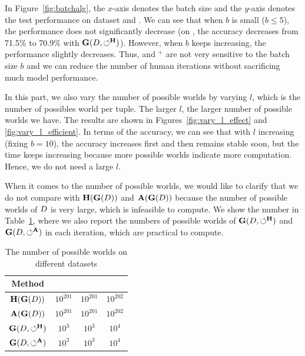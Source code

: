 
In Figure~\ref{fig:batchalg}, the $x$-axis denotes the batch size and the $y$-axis denotes the test performance on dataset \adult and  \imdbl. We can see that when $b$ is small (\ie $b \le 5$), the performance does not significantly decrease (\eg on \imdbl, the accuracy decreases from 71.5\% to 70.9\% with $\mathbf{G}(D,\circlearrowleft^\mathbf{H})$). However, when $b$ keeps increasing, the performance slightly decreases. Thus, \ours  and \ours$^+$ are not very sensitive to the batch size $b$ and we can reduce the number of human iterations without sacrificing much  model performance.


In this part, we also vary the number of possible worlds by varying $l$, which is the number of possibles world per tuple. The larger $l$, the larger number of possible worlds we have. The results are shown in Figures~\ref{fig:vary_l_effect} and  \ref{fig:vary_l_efficient}. In terms of the accuracy, we can see that with $l$ increasing (fixing $b=10$), the accuracy increases first and then  remains stable soon, but the time keeps increasing because more possible worlds indicate more computation. Hence, we do not need a large $l$.

When it comes to the number of possible worlds, we would like to clarify that we do not compare with $\mathbf{H}(\mathbf{G}(D))$ and $\mathbf{A}(\mathbf{G}(D))$ because  the number of  possible worlds of $D$ is very large, which is infeasible to compute. We show the number in Table~\ref{tbl:pwnum}, where we also report the numbers of possible worlds of $\mathbf{G}(D,\circlearrowleft^\mathbf{H})$ and $\mathbf{G}(D,\circlearrowleft^\mathbf{A})$ in each iteration, which are practical to compute.


\begin{table}
	\centering
	\caption{The number of possible worlds on different datasets}
	{\small
		\begin{tabular}{cccc}
			\hline
			{\bf Method} & {\bf \nursery} & {\bf \hr} & {\bf \adult} \\
			\hline	
			$\mathbf{H}(\mathbf{G}(D))$ & $10^{201}$ & $10^{201}$ & $10^{202}$ \\
			$\mathbf{A}(\mathbf{G}(D))$ & $10^{201}$ & $10^{201}$ & $10^{202}$ \\
			$\mathbf{G}(D,\circlearrowleft^\mathbf{H})$ & $10^3$ & $10^3$ & $10^4$ \\
			$\mathbf{G}(D,\circlearrowleft^\mathbf{A})$ & $10^3$ & $10^3$ & $10^4$ \\
			\hline
		\end{tabular}
	}
	\label{tbl:pwnum}
	\vspace{-1em}
\end{table}

